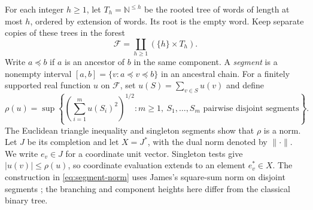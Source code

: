 For each integer $h\ge1$, let $T_h=\mathbb N^{\le h}$ be the
rooted tree of words of length at most $h$, ordered by extension of
words. Its root is the empty word. Keep separate copies of these trees
in the forest
\[
 \mathcal F=\coprod_{h\ge1}(\{h\}\times T_h).
\]
Write $a\preceq b$ if $a$ is an ancestor of $b$ in the same component.
A \emph{segment} is a nonempty interval
$[a,b]=\{v:a\preceq v\preceq b\}$ in an ancestral chain.
For a finitely supported real function $u$ on $\mathcal F$, set
$u(S)=\sum_{v\in S}u(v)$ and define
\begin{equation}\label{eq:segment-norm}
 \rho(u)=\sup\left\{\left(\sum_{i=1}^m u(S_i)^2\right)^{1/2}:
  m\ge1,\ S_1,\ldots,S_m\text{ pairwise disjoint segments}\right\}.
\end{equation}
The Euclidean triangle inequality and singleton segments show that
$\rho$ is a norm. Let $J$ be its completion and let $X=J^*$, with
the dual norm denoted by $\|\cdot\|$. We write $e_v\in J$ for a
coordinate unit vector. Singleton tests give $|u(v)|\le\rho(u)$,
so coordinate evaluation extends to an element $e_v^*\in X$.
The construction in \eqref{eq:segment-norm} uses James's
square-sum norm on disjoint segments \cite[p.~739]{James1974}; the
branching and component heights here differ from the classical binary
tree.
